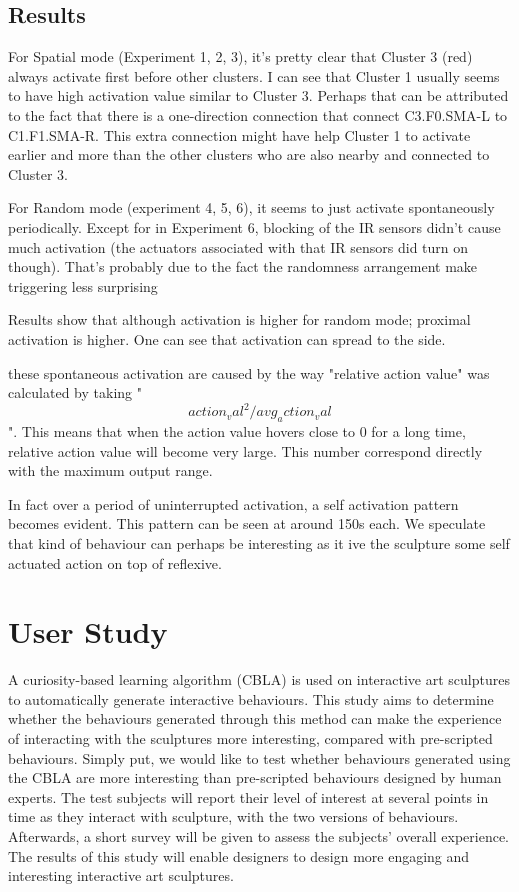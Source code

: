 \subsection{Results}
For Spatial mode (Experiment 1, 2, 3), it's pretty clear that Cluster 3 (red) always activate first before other clusters. I can see that Cluster 1 usually seems to have high activation value similar to Cluster 3. Perhaps that can be attributed to the fact that there is a one-direction connection that connect C3.F0.SMA-L to C1.F1.SMA-R. This extra connection might have help Cluster 1 to activate earlier and more than the other clusters who are also nearby and connected to Cluster 3.


For Random mode (experiment 4, 5, 6), it seems to just activate spontaneously periodically. Except for in Experiment 6, blocking of the IR sensors didn't cause much activation (the actuators associated with that IR sensors did turn on though). That's probably due to the fact the randomness arrangement make triggering less surprising 

Results show that although activation is higher for random mode; proximal activation is higher. One can see that activation can spread to the side. 

these spontaneous activation are caused by the way "relative action value" was calculated by taking "\[action_val^2/avg_action_val\]". This means that when the action value hovers close to 0 for a long time, relative action value will become very large. This number correspond directly with the maximum output range. 

In fact over a period of uninterrupted activation, a self activation pattern becomes evident. This pattern can be seen at around 150s each. We speculate that kind of behaviour can perhaps be interesting as it ive the sculpture some self actuated action on top of reflexive.  



\section{User Study}

A curiosity-based learning algorithm (CBLA) is used on interactive art sculptures to automatically generate interactive behaviours. This study aims to determine whether the behaviours generated through this method can make the experience of interacting with the sculptures more interesting, compared with pre-scripted behaviours. Simply put, we would like to test whether behaviours generated using the CBLA are more interesting than pre-scripted behaviours designed by human experts. The test subjects will report their level of interest at several points in time as they interact with sculpture, with the two versions of behaviours. Afterwards, a short survey will be given to assess the subjects' overall experience. The results of this study will enable designers to design more engaging and interesting interactive art sculptures. 

